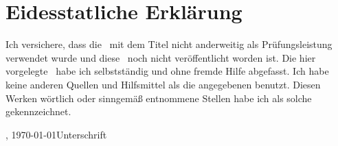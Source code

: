 
\chapter*{Eidesstatliche Erklärung}
\label{sec:EidesstatlicheErklärung}

Ich versichere, dass die \arbeit\ mit dem Titel \glqq{}\titel\grqq{} nicht
anderweitig als Prüfungsleistung verwendet wurde und diese \arbeit\ noch
nicht veröffentlicht worden ist. Die hier vorgelegte \arbeit\ habe ich
selbstständig und ohne fremde Hilfe abgefasst. Ich habe keine anderen Quellen und Hilfsmittel als die angegebenen benutzt. Diesen Werken wörtlich oder sinngemäß entnommene Stellen habe ich als solche gekennzeichnet.
\vfill

\begin{center}
\begin{minipage}{0.9\textwidth}
\ort, \today \hfill  Unterschrift
\end{minipage}
\end{center}



